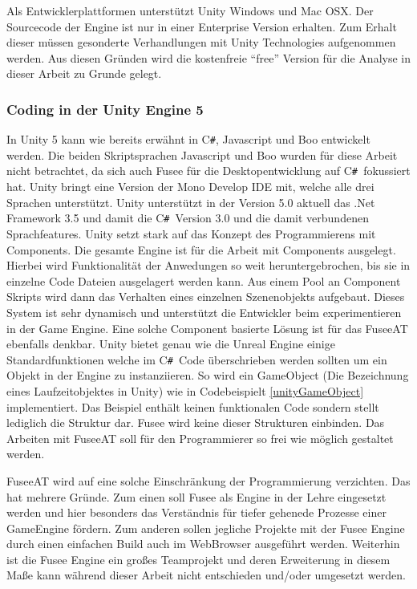 \documentclass[pagesize, paper=a4, fontsize=12pt, titlepage=true, headings=small, headnosepline, abstractoff, liststotoc, nochapterprefix, plainheadsepline, twoside]{scrreprt}
\newcommand{\CS}{C\texttt{\#}}
\newcommand{\CSS}{C\texttt{\# }}
\begin{document}
Als Entwicklerplattformen unterstützt Unity Windows und Mac OSX. Der Sourcecode der Engine ist nur in einer Enterprise Version erhalten. Zum Erhalt dieser müssen gesonderte Verhandlungen mit Unity Technologies aufgenommen werden. Aus diesen Gründen wird die kostenfreie “free” Version für die Analyse in dieser Arbeit zu Grunde gelegt.

\subsubsection{Coding in der Unity Engine 5}
In Unity 5 kann wie bereits erwähnt in \CS, Javascript und Boo entwickelt werden. Die beiden Skriptsprachen Javascript und Boo wurden für diese Arbeit nicht betrachtet, da sich auch Fusee für die Desktopentwicklung auf \CSS fokussiert hat. Unity bringt eine Version der Mono Develop IDE mit, welche alle drei Sprachen unterstützt. Unity unterstützt in der Version 5.0 aktuell das .Net Framework 3.5 und damit die \CSS Version 3.0 und die damit verbundenen Sprachfeatures. Unity setzt stark auf das Konzept des Programmierens mit Components. Die gesamte Engine ist für die Arbeit mit Components ausgelegt. Hierbei wird Funktionalität der Anwedungen so weit heruntergebrochen, bis sie in einzelne Code Dateien ausgelagert werden kann. Aus einem Pool an Component Skripts wird dann das Verhalten eines einzelnen Szenenobjekts aufgebaut. Dieses System ist sehr dynamisch und unterstützt die Entwickler beim experimentieren in der Game Engine. Eine solche Component basierte Lösung ist für das FuseeAT ebenfalls denkbar. Unity bietet genau wie die Unreal Engine einige Standardfunktionen welche im \CSS Code überschrieben werden sollten um ein Objekt in der Engine zu instanziieren. So wird ein GameObject (Die Bezeichnung eines Laufzeitobjektes in Unity) wie in Codebeispielt \ref{unityGameObject} implementiert. Das Beispiel enthält keinen funktionalen Code sondern stellt lediglich die Struktur dar. Fusee wird keine dieser Strukturen einbinden. Das Arbeiten mit FuseeAT soll für den Programmierer so frei wie möglich gestaltet werden.



FuseeAT wird auf eine solche Einschränkung der Programmierung verzichten. Das hat mehrere Gründe. Zum einen soll Fusee als Engine in der Lehre eingesetzt werden und hier besonders das Verständnis für tiefer gehenede Prozesse einer GameEngine fördern. Zum anderen sollen jegliche Projekte mit der Fusee Engine durch einen einfachen Build auch im WebBrowser ausgeführt werden. Weiterhin ist die Fusee Engine ein großes Teamprojekt und deren Erweiterung in diesem Maße kann während dieser Arbeit nicht entschieden und/oder umgesetzt werden.
\end{document}
